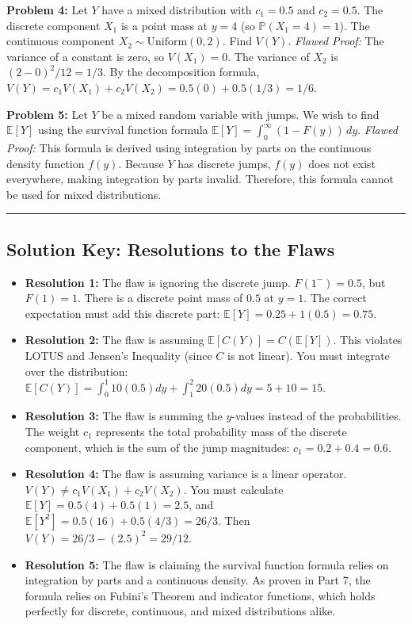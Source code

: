 \documentclass[11pt, a4paper]{article}
\theoremstyle{definition}
\theoremstyle{remark}
\newcommand{\E}{\mathbb{E}}
\newcommand{\Prob}{\mathbb{P}}
\begin{document}
\textbf{Problem 4:} Let $Y$ have a mixed distribution with $c_1 = 0.5$ and $c_2 = 0.5$. The discrete component $X_1$ is a point mass at $y=4$ (so $\Prob(X_1 = 4) = 1$). The continuous component $X_2 \sim \text{Uniform}(0,2)$. Find $V(Y)$.
\textit{Flawed Proof:} The variance of a constant is zero, so $V(X_1) = 0$. The variance of $X_2$ is $(2-0)^2 / 12 = 1/3$. By the decomposition formula, $V(Y) = c_1 V(X_1) + c_2 V(X_2) = 0.5(0) + 0.5(1/3) = 1/6$.

\textbf{Problem 5:} Let $Y$ be a mixed random variable with jumps. We wish to find $\E[Y]$ using the survival function formula $\E[Y] = \int_{0}^{\infty} (1 - F(y)) \, dy$.
\textit{Flawed Proof:} This formula is derived using integration by parts on the continuous density function $f(y)$. Because $Y$ has discrete jumps, $f(y)$ does not exist everywhere, making integration by parts invalid. Therefore, this formula cannot be used for mixed distributions.

\vspace{0.5cm}
\hrule
\vspace{0.5cm}

\subsection{Solution Key: Resolutions to the Flaws}
\begin{itemize}
    \item \textbf{Resolution 1:} The flaw is ignoring the discrete jump. $F(1^-) = 0.5$, but $F(1) = 1$. There is a discrete point mass of $0.5$ at $y=1$. The correct expectation must add this discrete part: $\E[Y] = 0.25 + 1(0.5) = 0.75$.
    \item \textbf{Resolution 2:} The flaw is assuming $\E[C(Y)] = C(\E[Y])$. This violates LOTUS and Jensen's Inequality (since $C$ is not linear). You must integrate over the distribution: $\E[C(Y)] = \int_{0}^{1} 10(0.5)dy + \int_{1}^{2} 20(0.5)dy = 5 + 10 = 15$.
    \item \textbf{Resolution 3:} The flaw is summing the $y$-values instead of the probabilities. The weight $c_1$ represents the total probability mass of the discrete component, which is the sum of the jump magnitudes: $c_1 = 0.2 + 0.4 = 0.6$.
    \item \textbf{Resolution 4:} The flaw is assuming variance is a linear operator. $V(Y) \neq c_1 V(X_1) + c_2 V(X_2)$. You must calculate $\E[Y] = 0.5(4) + 0.5(1) = 2.5$, and $\E[Y^2] = 0.5(16) + 0.5(4/3) = 26/3$. Then $V(Y) = 26/3 - (2.5)^2 = 29/12$.
    \item \textbf{Resolution 5:} The flaw is claiming the survival function formula relies on integration by parts and a continuous density. As proven in Part 7, the formula relies on Fubini's Theorem and indicator functions, which holds perfectly for discrete, continuous, and mixed distributions alike.
\end{itemize}
\end{document}
